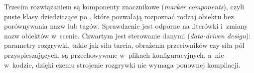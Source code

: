 Trzecim rozwiązaniem są komponenty znacznikowe (\emph{marker components}), czyli puste klasy
dziedziczące po , które pozwalają rozpoznać rodzaj obiektu bez
porównywania nazw lub tagów. Sprawdzenie  jest
odporne na literówki i~zmiany nazw obiektów w~scenie. Czwartym jest sterowanie danymi
(\emph{data-driven design}): parametry rozgrywki, takie jak siła tarcia, obrażenia
przeciwników czy siła pól przyspieszających, są przechowywane w~plikach konfiguracyjnych,
a~nie w~kodzie, dzięki czemu strojenie rozgrywki nie wymaga ponownej kompilacji.
